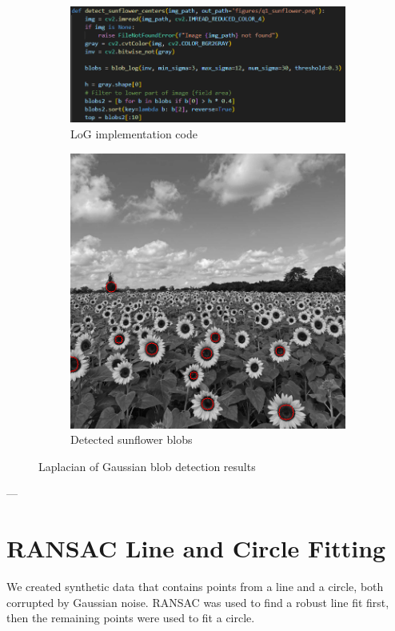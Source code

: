 \documentclass[11pt,a4paper]{article}
\begin{document}
\begin{figure}[H]\centering
\begin{subfigure}{0.45\textwidth}
\includegraphics[width=\linewidth]{images/q1_code.png}
\caption{LoG implementation code}
\end{subfigure}\hfill
\begin{subfigure}{0.45\textwidth}
\includegraphics[width=\linewidth]{figures/q1_sunflower.png}
\caption{Detected sunflower blobs}
\end{subfigure}
\caption{Laplacian of Gaussian blob detection results}
\end{figure}

---

\section{RANSAC Line and Circle Fitting}
We created synthetic data that contains points from a line and a circle, both corrupted by Gaussian noise. RANSAC was used to find a robust line fit first, then the remaining points were used to fit a circle.
\end{document}
